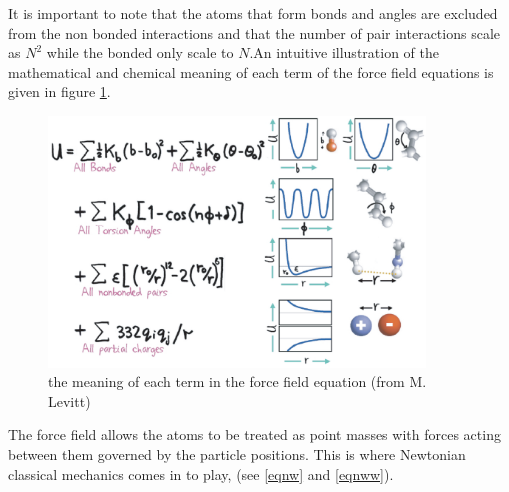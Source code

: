 \documentclass[a4paper,12pt]{article}
\begin{document}
It is important to note that the atoms that form bonds and angles
are excluded from the non bonded interactions and that the number 
of pair interactions scale as
$N^2$ while the bonded only scale to $N$.\newline An intuitive
illustration of the mathematical and chemical meaning of each term
of the force field equations is given in figure \ref {FF}.
\newpage
\begin{figure}[!ht]
\begin{center}
\includegraphics[width=10cm]{FF}
\caption{\label{FF} the meaning of each term in the force field equation (from M. Levitt)}
\end{center}
\end{figure}

The force field allows the atoms to be treated as point masses with forces acting between them governed by the particle positions. This is where Newtonian classical mechanics comes in to play, (see \ref{eqnw} and \ref{eqnww}).
\end{document}
